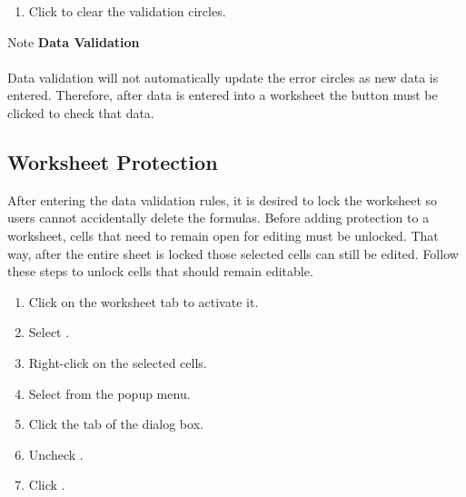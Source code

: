 \begin{enumerate}[resume]	
	\item Click  to clear the validation circles.
\end{enumerate}

\begin{center}
	\begin{infobox}{Note}
		\textbf{Data Validation}
		\\
		\\
		Data validation will not automatically update the error circles as new data is entered. Therefore, after data is entered into a worksheet the  button must be clicked to check that data.
	\end{infobox}
\end{center}

\subsection{Worksheet Protection}

After entering the data validation rules, it is desired to lock the  worksheet so users cannot accidentally delete the formulas. Before adding protection to a worksheet, cells that need to remain open for editing must be unlocked. That way, after the entire sheet is locked those selected cells can still be edited. Follow these steps to unlock cells that should remain editable. 

\begin{enumerate}
	\item Click on the  worksheet tab to activate it.
	\item Select . 
	\item Right-click on the selected cells.
	\item Select  from the popup menu.
	\item Click the  tab of the dialog box.
	\item Uncheck .
	\item Click .
\end{enumerate}

